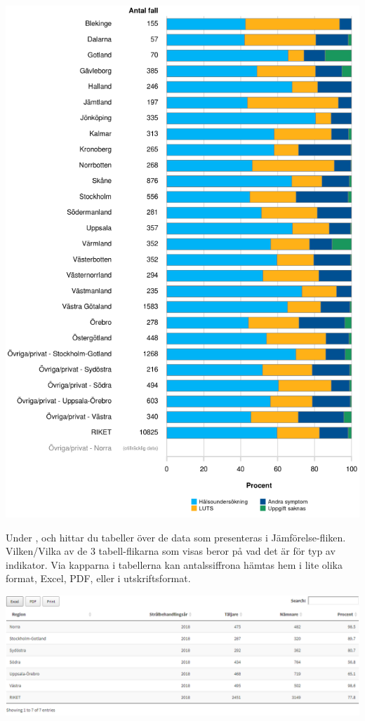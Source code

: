 \documentclass[10pt, a4paper,twoside]{report}
\begin{document}
\includegraphics[]{figurer/Jamforelse2}
\newline

Under \textcolor{useblue}{\selectfont{Tabell}}, \textcolor{useblue}{\selectfont{Tabell (Antal)}} och \textcolor{useblue}{\selectfont{Tabell (Andel)}} hittar du tabeller över de data som presenteras i Jämförelse-fliken. Vilken/Vilka av de 3 tabell-flikarna som visas beror på vad det är för typ av indikator. Via kapparna i tabellerna kan antalssiffrona hämtas hem i lite olika format, Excel, PDF, eller i utskriftsformat.

\includegraphics[]{figurer/Tabell}
\newline
\clearpage
\end{document}
